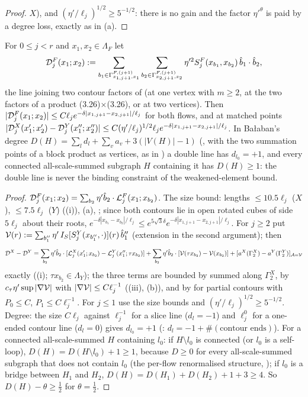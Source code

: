 \begin{proof}
$X$), and $(\eta'/\ell_j)^{1/2}\ge5^{-1/2}$: there is no gain and the factor $\eta'^\theta$ is paid by a degree loss, exactly as in (a).
\end{proof}

\begin{lemma}\label{rot:hyb:lem:DCL}
For $0\le j<r$ and $x_1,x_2\in\Lambda_F$ let
\[
\mathcal D^F_j(x_1;x_2):=\sum_{b_1\in\Gamma^{F,(j+1)}_{x_{1,j+1},x_1}}\sum_{b_2\in\Gamma^{F,(j+1)}_{x_{2,j+1},x_2}}\eta'^2S^F_j(x_{b_1},x_{b_2})\,\hat b_1\cdot\hat b_2,
\]
the line joining two contour factors of \cite[(3.26)]{K1} (at one vertex with $m\ge2$, at the two factors of a product (3.26)$\times$(3.26), or at two vertices). Then $|\mathcal D^F_j(x_1;x_2)|\le C\ell_je^{-\delta|x_{1,j+1}-x_{2,j+1}|/\ell_j}$ for both flows, and at matched points $|\mathcal D^X_j(x_1';x_2')-\mathcal D^Y_j(x_1'';x_2'')|\le C(\eta'/\ell_j)^{1/2}\ell_je^{-\delta|x_{1,j+1}-x_{2,j+1}|/\ell_j}$. In Ba{\l}aban's degree $D(H)=\sum_ld_l+\sum_va_v+3(|V(H)|-1)$ (\cite[(2.1)--(2.2)]{Ba3}, with the two summation points of a block product as vertices, as in ) a double line has $d_{l_0}=+1$, and every connected all-scale-summed subgraph $H$ containing it has $D(H)\ge1$: the double line is never the binding constraint of the weakened-element bound.
\end{lemma}
\begin{proof}
$\mathcal D^F_j(x_1;x_2)=\sum_{b_2}\eta'\hat b_2\cdot\mathcal L^F_j(x_1;x_{b_2})$. The size bound: lengths $\le10.5\ell_j$ ($X$), $\le7.5\ell_j$ ($Y$) ((i)), (a), \cite[(3.63)]{K1}; since both contours lie in open rotated cubes of side $5\ell_j$ about their roots, $e^{-\delta|x_{b_1}-x_{b_2}|/\ell_j}\le e^{5\sqrt3\delta}e^{-\delta|x_{1,j+1}-x_{2,j+1}|/\ell_j}$. For $j\ge2$ put $\mathcal V(r):=\sum_{b_1''}\eta'\,I_S[S^Y_j(x_{b_1''},\cdot)](r)\,\hat b_1''$ (extension in the second argument); then
\[
\mathcal D^X-\mathcal D^Y=\sum_{b_2}\eta'\hat b_2\cdot[\mathcal L^X_j(x_1';x_{b_2})-\mathcal L^Y_j(x_1'';\tau x_{b_2})]+\sum_{b_2}\eta'\hat b_2\cdot[\mathcal V(\tau x_{b_2})-\mathcal V(x_{b_2})]+[a^X(\Gamma^X_2)-a^Y(\Gamma^Y_2)]_{\mathcal A=\mathcal V}
\]
exactly ((i); $\tau x_{b_2}\in\Lambda_Y$); the three terms are bounded by  summed along $\Gamma^X_2$, by $c_\tau\eta'\sup|\nabla\mathcal V|$ with $|\nabla\mathcal V|\le C\ell_j^{-1}$ ((iii), (b)), and by  for partial contours with $P_0\le C$, $P_1\le C\ell_j^{-1}$. For $j\le1$ use the size bounds and $(\eta'/\ell_j)^{1/2}\ge5^{-1/2}$. Degree: the size $C\ell_j$ against $\ell_j^{-1}$ for a slice line ($d_l=-1$) and $\ell_j^0$ for a one-ended contour line ($d_l=0$) gives $d_{l_0}=+1$ (: $d_l=-1+\#(\text{contour ends})$). For a connected all-scale-summed $H$ containing $l_0$: if $H\setminus l_0$ is connected (or $l_0$ is a self-loop), $D(H)=D(H\setminus l_0)+1\ge1$, because $D\ge0$ for every all-scale-summed subgraph that does not contain $l_0$ (the per-flow renormalised structure, ); if $l_0$ is a bridge between $H_1$ and $H_2$, $D(H)=D(H_1)+D(H_2)+1+3\ge4$. So $D(H)-\theta\ge\frac12$ for $\theta=\frac12$.
\end{proof}

